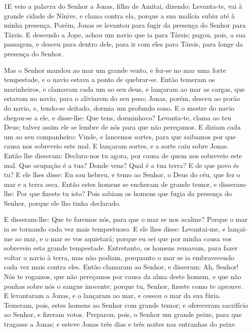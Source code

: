 
\lettrine{1} E veio a palavra do Senhor a Jonas, filho de
Amitai, dizendo: Levanta-te, vai à grande cidade de Nínive, e
clama contra ela, porque a sua malícia subiu até à minha presença.
Porém, Jonas se levantou para fugir da presença do Senhor para
Társis. E descendo a Jope, achou um navio que ia para Társis; pagou,
pois, a sua passagem, e desceu para dentro dele, para ir com eles
para Társis, para longe da presença do Senhor.

Mas o Senhor mandou ao mar um grande vento, e fez-se no mar uma
forte tempestade, e o navio estava a ponto de quebrar-se. Então
temeram os marinheiros, e clamavam cada um ao seu deus, e lançaram
ao mar as cargas, que estavam no navio, para o aliviarem do seu
peso; Jonas, porém, desceu ao porão do navio, e, tendo-se deitado,
dormia um profundo sono. E o mestre do navio chegou-se a ele, e
disse-lhe: Que tens, dorminhoco? Levanta-te, clama ao teu Deus;
talvez assim ele se lembre de nós para que não pereçamos. E
diziam cada um ao seu companheiro: Vinde, e lancemos sortes, para
que saibamos por que causa nos sobreveio este mal. E lançaram
sortes, e a sorte caiu sobre Jonas. Então lhe disseram:
Declara-nos tu agora, por causa de quem nos sobreveio este mal. Que
ocupação é a tua? Donde vens? Qual é a tua terra? E de que povo és
tu? E ele lhes disse: Eu sou hebreu, e temo ao Senhor, o Deus do
céu, que fez o mar e a terra seca. Então estes homens se
encheram de grande temor, e disseram-lhe: Por que fizeste tu isto?
Pois sabiam os homens que fugia da presença do Senhor, porque ele
lho tinha declarado.

E disseram-lhe: Que te faremos nós, para que o mar se nos acalme?
Porque o mar ia se tornando cada vez mais tempestuoso. E ele
lhes disse: Levantai-me, e lançai-me ao mar, e o mar se vos
aquietará; porque eu sei que por minha causa vos sobreveio esta
grande tempestade. Entretanto, os homens remavam, para fazer
voltar o navio à terra, mas não podiam, porquanto o mar se ia
embravecendo cada vez mais contra eles. Então clamaram ao
Senhor, e disseram: Ah, Senhor! Nós te rogamos, que não pereçamos
por causa da alma deste homem, e que não ponhas sobre nós o sangue
inocente; porque tu, Senhor, fizeste como te aprouve. E
levantaram a Jonas, e o lançaram ao mar, e cessou o mar da sua
fúria. Temeram, pois, estes homens ao Senhor com grande
temor; e ofereceram sacrifício ao Senhor, e fizeram votos.
Preparou, pois, o Senhor um grande peixe, para que tragasse a
Jonas; e esteve Jonas três dias e três noites nas entranhas do
peixe.

